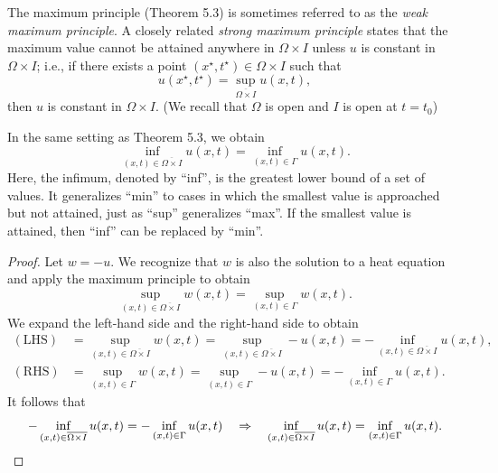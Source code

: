 \begin{nremark}[][5.4]
    The maximum principle (Theorem 5.3) is sometimes referred to as the \textit{weak maximum principle}. A closely related \textit{strong maximum principle} states that the maximum value cannot be attained anywhere in $\Omega \times I$ unless $u$ is constant in $\Omega \times I$; i.e., if there exists a point $(x^\star, t^\star) \in \Omega \times I$ such that
    \[u(x^\star, t^\star) = \sup_{\overline{\Omega \times I}} u(x, t),\]
    then $u$ is constant in $\Omega \times I$. (We recall that $\Omega$ is open and $I$ is open at $t = t_0$)
\end{nremark}

\begin{theorem}
    In the same setting as Theorem 5.3, we obtain
    \[\inf_{(x,t) \in \overline{\Omega \times I}} u(x, t) = \inf_{(x,t) \in \Gamma} u(x, t).\]
    Here, the infimum, denoted by ``inf'', is the greatest lower bound of a set of values. It generalizes ``min'' to cases in which the smallest value is approached but not attained, just as ``sup'' generalizes ``max''. If the smallest value is attained, then ``inf'' can be replaced by ``min''.
\end{theorem}
\begin{proof}
    Let $w = -u$. We recognize that $w$ is also the solution to a heat equation and apply the maximum principle to obtain
    \[\sup_{(x,t) \in \overline{\Omega \times I}} w(x, t) = \sup_{(x,t) \in \Gamma} w(x, t).\]
    We expand the left-hand side and the right-hand side to obtain
    \begin{align*}
        (\text{LHS}) &= \sup_{(x,t) \in \overline{\Omega \times I}} w(x, t) = \sup_{(x,t) \in \overline{\Omega \times I}} -u(x, t) = -\inf_{(x,t) \in \overline{\Omega \times I}} u(x, t), \\
        (\text{RHS}) &= \sup_{(x,t) \in \Gamma} w(x, t) = \sup_{(x,t) \in \Gamma} -u(x, t) = -\inf_{(x,t) \in \Gamma} u(x, t).
    \end{align*}
    It follows that
    \[-\inf_{(x,t) \in \overline{\Omega \times I}} u(x, t) = -\inf_{(x,t) \in \Gamma} u(x, t) \quad \Rightarrow \quad \inf_{(x,t) \in \overline{\Omega \times I}} u(x, t) = \inf_{(x,t) \in \Gamma} u(x, t). \qedhere\]
\end{proof}

